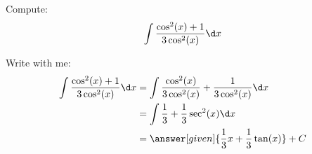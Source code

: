 \documentclass[nooutcomes]{ximera}
\begin{document}
\begin{example}
  Compute:
  \[
  \int \frac{\cos^2(x)+1}{3 \cos^2(x)}\d x
  \]
 
  \begin{explanation}
    Write with me:
    \begin{align*}
    \int \frac{\cos^2(x)+1}{3 \cos^2(x)}\d x &=  \int \frac{\cos^2(x)}{3 \cos^2(x)} +  \frac{1}{3 \cos^2(x)}\d x \\
    &= \int \frac{1}{3} + \frac{1}{3} \sec^2(x) \d x \\
    & = \answer[given]{\frac{1}{3}x+\frac{1}{3}\tan(x)}+C 
    \end{align*}
      
  \end{explanation}
\end{example}
\end{document}
